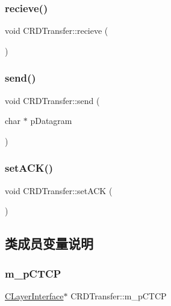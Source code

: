 \subsubsection{\texorpdfstring{recieve()}{recieve()}}
{\footnotesize\ttfamily void C\+R\+D\+Transfer\+::recieve (\begin{DoxyParamCaption}{ }\end{DoxyParamCaption})}

\mbox{\label{class_c_r_d_transfer_ac98920ca7fa69b7d4ad47587a860e3f5}} 
\subsubsection{\texorpdfstring{send()}{send()}}
{\footnotesize\ttfamily void C\+R\+D\+Transfer\+::send (\begin{DoxyParamCaption}\item[{char $\ast$}]{p\+Datagram }\end{DoxyParamCaption})}

\mbox{\label{class_c_r_d_transfer_a35f5c58df35d4c513e5172d41e7707e0}} 
\subsubsection{\texorpdfstring{set\+A\+C\+K()}{setACK()}}
{\footnotesize\ttfamily void C\+R\+D\+Transfer\+::set\+A\+CK (\begin{DoxyParamCaption}{ }\end{DoxyParamCaption})}



\subsection{类成员变量说明}
\mbox{\label{class_c_r_d_transfer_a738fa552807680744a202da502ec61fa}} 
\subsubsection{\texorpdfstring{m\+\_\+p\+C\+T\+CP}{m\_pCTCP}}
{\footnotesize\ttfamily \hyperlink{class_c_layer_interface}{C\+Layer\+Interface}$\ast$ C\+R\+D\+Transfer\+::m\+\_\+p\+C\+T\+CP}



